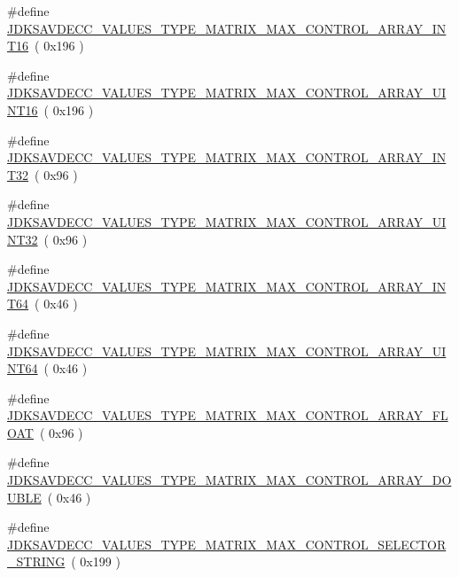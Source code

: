 \begin{DoxyCompactItemize}
\#define \hyperlink{group__values__type__matrix__max_gaf34a269d11ade16dea553dab1d803aff}{J\+D\+K\+S\+A\+V\+D\+E\+C\+C\+\_\+\+V\+A\+L\+U\+E\+S\+\_\+\+T\+Y\+P\+E\+\_\+\+M\+A\+T\+R\+I\+X\+\_\+\+M\+A\+X\+\_\+\+C\+O\+N\+T\+R\+O\+L\+\_\+\+A\+R\+R\+A\+Y\+\_\+\+I\+N\+T16}~( 0x196 )
\item 
\#define \hyperlink{group__values__type__matrix__max_gab25036b118e6d8c11b2e049f13545f17}{J\+D\+K\+S\+A\+V\+D\+E\+C\+C\+\_\+\+V\+A\+L\+U\+E\+S\+\_\+\+T\+Y\+P\+E\+\_\+\+M\+A\+T\+R\+I\+X\+\_\+\+M\+A\+X\+\_\+\+C\+O\+N\+T\+R\+O\+L\+\_\+\+A\+R\+R\+A\+Y\+\_\+\+U\+I\+N\+T16}~( 0x196 )
\item 
\#define \hyperlink{group__values__type__matrix__max_gae9e760dccd9669203b923761c2cc2326}{J\+D\+K\+S\+A\+V\+D\+E\+C\+C\+\_\+\+V\+A\+L\+U\+E\+S\+\_\+\+T\+Y\+P\+E\+\_\+\+M\+A\+T\+R\+I\+X\+\_\+\+M\+A\+X\+\_\+\+C\+O\+N\+T\+R\+O\+L\+\_\+\+A\+R\+R\+A\+Y\+\_\+\+I\+N\+T32}~( 0x96 )
\item 
\#define \hyperlink{group__values__type__matrix__max_ga1f2ef8533ae7e10943ae679f69d70d09}{J\+D\+K\+S\+A\+V\+D\+E\+C\+C\+\_\+\+V\+A\+L\+U\+E\+S\+\_\+\+T\+Y\+P\+E\+\_\+\+M\+A\+T\+R\+I\+X\+\_\+\+M\+A\+X\+\_\+\+C\+O\+N\+T\+R\+O\+L\+\_\+\+A\+R\+R\+A\+Y\+\_\+\+U\+I\+N\+T32}~( 0x96 )
\item 
\#define \hyperlink{group__values__type__matrix__max_ga50392e68e4f11bc6742b7ad870ecf870}{J\+D\+K\+S\+A\+V\+D\+E\+C\+C\+\_\+\+V\+A\+L\+U\+E\+S\+\_\+\+T\+Y\+P\+E\+\_\+\+M\+A\+T\+R\+I\+X\+\_\+\+M\+A\+X\+\_\+\+C\+O\+N\+T\+R\+O\+L\+\_\+\+A\+R\+R\+A\+Y\+\_\+\+I\+N\+T64}~( 0x46 )
\item 
\#define \hyperlink{group__values__type__matrix__max_ga3b891fec8fe6d5ac2aff2fcd63ac1875}{J\+D\+K\+S\+A\+V\+D\+E\+C\+C\+\_\+\+V\+A\+L\+U\+E\+S\+\_\+\+T\+Y\+P\+E\+\_\+\+M\+A\+T\+R\+I\+X\+\_\+\+M\+A\+X\+\_\+\+C\+O\+N\+T\+R\+O\+L\+\_\+\+A\+R\+R\+A\+Y\+\_\+\+U\+I\+N\+T64}~( 0x46 )
\item 
\#define \hyperlink{group__values__type__matrix__max_ga6de8ef35681f6c2908ea79ece902dcca}{J\+D\+K\+S\+A\+V\+D\+E\+C\+C\+\_\+\+V\+A\+L\+U\+E\+S\+\_\+\+T\+Y\+P\+E\+\_\+\+M\+A\+T\+R\+I\+X\+\_\+\+M\+A\+X\+\_\+\+C\+O\+N\+T\+R\+O\+L\+\_\+\+A\+R\+R\+A\+Y\+\_\+\+F\+L\+O\+AT}~( 0x96 )
\item 
\#define \hyperlink{group__values__type__matrix__max_gafeb58a03e060aeae52dc1d495c0caa1b}{J\+D\+K\+S\+A\+V\+D\+E\+C\+C\+\_\+\+V\+A\+L\+U\+E\+S\+\_\+\+T\+Y\+P\+E\+\_\+\+M\+A\+T\+R\+I\+X\+\_\+\+M\+A\+X\+\_\+\+C\+O\+N\+T\+R\+O\+L\+\_\+\+A\+R\+R\+A\+Y\+\_\+\+D\+O\+U\+B\+LE}~( 0x46 )
\item 
\#define \hyperlink{group__values__type__matrix__max_ga668895611d7a40241205551cc0d69e50}{J\+D\+K\+S\+A\+V\+D\+E\+C\+C\+\_\+\+V\+A\+L\+U\+E\+S\+\_\+\+T\+Y\+P\+E\+\_\+\+M\+A\+T\+R\+I\+X\+\_\+\+M\+A\+X\+\_\+\+C\+O\+N\+T\+R\+O\+L\+\_\+\+S\+E\+L\+E\+C\+T\+O\+R\+\_\+\+S\+T\+R\+I\+NG}~( 0x199 )

\end{DoxyCompactItemize}
